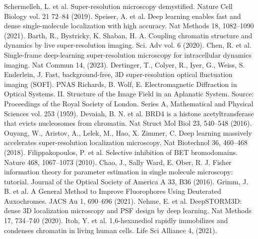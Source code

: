 \documentclass{ucetd}
\begin{document}
\noindent [1] Schermelleh, L. et al. Super-resolution microscopy demystified. Nature Cell Biology vol. 21 72–84 (2019). 
\newline
\noindent [2] Speiser, A. et al. Deep learning enables fast and dense single-molecule localization with high accuracy. Nat Methods 18, 1082–1090 (2021).
\newline
\noindent [3] Barth, R., Bystricky, K. Shaban, H. A. Coupling chromatin structure and dynamics by live super-resolution imaging. Sci. Adv vol. 6 (2020). 
\newline
\noindent [4] Chen, R. et al. Single-frame deep-learning super-resolution microscopy for intracellular dynamics imaging. Nat Commun 14, (2023). 
\newline
\noindent [5] Dertinger, T., Colyer, R., Iyer, G., Weiss, S. Enderlein, J. Fast, background-free, 3D super-resolution optical fluctuation imaging (SOFI). PNAS
\newline
\noindent [6] Richards, B. Wolf, E. Electromagnetic Diffraction in Optical Systems. II. Structure of the Image Field in an Aplanatic System. Source: Proceedings of the Royal Society of London. Series A, Mathematical and Physical Sciences vol. 253 (1959). 
\newline
\noindent [7] Devaiah, B. N. et al. BRD4 is a histone acetyltransferase that evicts nucleosomes from chromatin. Nat Struct Mol Biol 23, 540–548 (2016). 
\newline
\noindent [8] Ouyang, W., Aristov, A., Lelek, M., Hao, X. Zimmer, C. Deep learning massively accelerates super-resolution localization microscopy. Nat Biotechnol 36, 460–468 (2018). 
\newline
\noindent [9] Filippakopoulos, P. et al. Selective inhibition of BET bromodomains. Nature 468, 1067–1073 (2010). 
\newline
\noindent [10] Chao, J., Sally Ward, E. Ober, R. J. Fisher information theory for parameter estimation in single molecule microscopy: tutorial. Journal of the Optical Society of America A 33, B36 (2016). 
\newline
\noindent [10] Grimm, J. B. et al. A General Method to Improve Fluorophores Using Deuterated Auxochromes. JACS Au 1, 690–696 (2021). 
\newline
\noindent [12] Nehme, E. et al. DeepSTORM3D: dense 3D localization microscopy and PSF design by deep learning. Nat Methods 17, 734–740 (2020). 
\newline
\noindent [13] Itoh, Y. et al. 1,6-hexanediol rapidly immobilizes and condenses chromatin in living human cells. Life Sci Alliance 4, (2021). 
\end{document}
